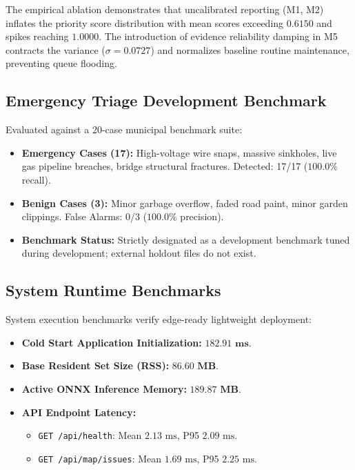\documentclass[conference]{IEEEtran}
\begin{document}
The empirical ablation demonstrates that uncalibrated reporting (M1, M2) inflates the priority score distribution with mean scores exceeding $0.6150$ and spikes reaching $1.0000$. The introduction of evidence reliability damping in M5 contracts the variance ($\sigma=0.0727$) and normalizes baseline routine maintenance, preventing queue flooding.

\subsection{Emergency Triage Development Benchmark}
Evaluated against a 20-case municipal benchmark suite:
\begin{itemize}
    \item \textbf{Emergency Cases (17):} High-voltage wire snaps, massive sinkholes, live gas pipeline breaches, bridge structural fractures. Detected: 17/17 ($\mathbf{100.0\%}$ recall).
    \item \textbf{Benign Cases (3):} Minor garbage overflow, faded road paint, minor garden clippings. False Alarms: 0/3 ($\mathbf{100.0\%}$ precision).
    \item \textbf{Benchmark Status:} Strictly designated as a development benchmark tuned during development; external holdout files do not exist.
\end{itemize}

\subsection{System Runtime Benchmarks}
System execution benchmarks verify edge-ready lightweight deployment:
\begin{itemize}
    \item \textbf{Cold Start Application Initialization:} $\mathbf{182.91\text{ ms}}$.
    \item \textbf{Base Resident Set Size (RSS):} $\mathbf{86.60\text{ MB}}$.
    \item \textbf{Active ONNX Inference Memory:} $\mathbf{189.87\text{ MB}}$.
    \item \textbf{API Endpoint Latency:}
    \begin{itemize}
        \item \texttt{GET /api/health}: Mean $2.13\text{ ms}$, P95 $2.09\text{ ms}$.
        \item \texttt{GET /api/map/issues}: Mean $1.69\text{ ms}$, P95 $2.25\text{ ms}$.
    \end{itemize}
\end{itemize}
\end{document}
